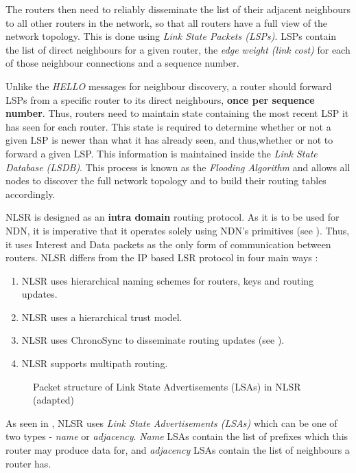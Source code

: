 The routers then need to reliably disseminate the list of their adjacent neighbours to all other routers in the network, so that all routers have a full view of the network topology. This is done using \textit{Link State Packets (LSPs)}. LSPs contain the list of direct neighbours for a given router, the \textit{edge weight (link cost)} for each of those neighbour connections and a sequence number. 

Unlike the \textit{HELLO} messages for neighbour discovery, a router should forward LSPs from a specific router to its direct neighbours, \textbf{once per sequence number}. Thus, routers need to maintain state containing the most recent LSP it has seen for each router. This state is required to determine whether or not a given LSP is newer than what it has already seen, and thus,whether or not to forward a given LSP. This information is maintained inside the \textit{Link State Database (LSDB)}. This process is known as the \textit{Flooding Algorithm} and allows all nodes to discover the full network topology and to build their routing tables accordingly.

NLSR is designed as an \textbf{intra domain} routing protocol. As it is to be used for NDN, it is imperative that it operates solely using NDN's primitives (see ). Thus, it uses Interest and Data packets as the only form of communication between routers. NLSR differs from the IP based LSR protocol in four main ways \cite{nlsr}:

\begin{enumerate}
    \item NLSR uses hierarchical naming schemes for routers, keys and routing updates.
    \item NLSR uses a hierarchical trust model.
    \item NLSR uses ChronoSync to disseminate routing updates (see ).
    \item NLSR supports multipath routing.
\end{enumerate}

\begin{figure}[H]
    \centering
    \caption{Packet structure of Link State Advertisements (LSAs) in NLSR \cite{nlsr} (adapted)}
    \label{fig:nlsr-lsa}
\end{figure}

As seen in , NLSR uses \textit{Link State Advertisements (LSAs)} which can be one of two types - \textit{name} or \textit{adjacency}. \textit{Name} LSAs contain the list of prefixes which this router may produce data for, and \textit{adjacency} LSAs contain the list of neighbours a router has.

